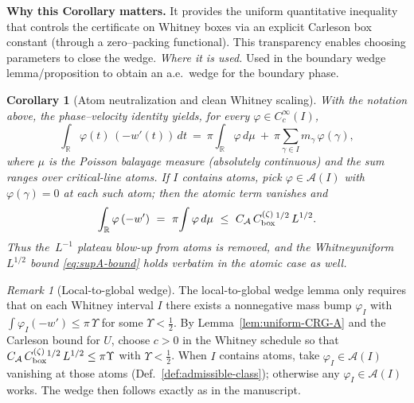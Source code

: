 \documentclass[11pt]{article}
\newtheorem{corollary}{Corollary}[section]
\theoremstyle{definition}
\theoremstyle{remark}
\newtheorem{remark}{Remark}[section]
\newcommand{\R}{\mathbb{R}}
\begin{document}
\vspace{1.0cm}
\noindent\textbf{Why this Corollary matters.} It provides the uniform quantitative inequality that controls the certificate on Whitney boxes via an explicit Carleson box constant (through a zero--packing functional). This transparency enables choosing parameters to close the wedge.
\noindent\textit{Where it is used.} Used in the boundary wedge lemma/proposition to obtain an a.e.\ wedge for the boundary phase.
\begin{corollary}[Atom neutralization and clean Whitney scaling]\label{cor:atom-safe}
With the notation above, the phase--velocity identity yields, for every \(\varphi\in C_c^\infty(I)\),
\[
  \int_{\R}\varphi(t)\,(-w'(t))\,dt
  \ =\ \pi\!\int_{\R}\varphi\,d\mu\ +\ \pi\sum_{\gamma\in I} m_\gamma\,\varphi(\gamma),
\]
where \(\mu\) is the Poisson balayage measure (absolutely continuous) and the sum ranges over critical-line atoms.
If \(I\) contains atoms, pick \(\varphi\in\mathcal A(I)\) with \(\varphi(\gamma)=0\) at each such atom; then the atomic term vanishes and
\[
  \int_{\R}\varphi\,(-w')\ =\ \pi\!\int \varphi\,d\mu\ \le\ C_{\mathcal A}\,C_{\rm box}^{(\zeta)}{}^{1/2}\,L^{1/2}.
\]
Thus the \(\,L^{-1}\) plateau blow-up from atoms is removed, and the Whitney\-uniform \(L^{1/2}\) bound \eqref{eq:supA-bound}
holds verbatim in the atomic case as well.
\end{corollary}


\begin{remark}[Local-to-global wedge]\label{rem:wedge-application}
The local-to-global wedge lemma only requires that on each Whitney interval \(I\) there exists a nonnegative mass bump
\(\varphi_I\) with \(\int \varphi_I(-w')\le \pi\,\Upsilon\) for some \(\Upsilon<\tfrac12\).
By Lemma~\ref{lem:uniform-CRG-A} and the Carleson bound for \(U\),
choose \(c>0\) in the Whitney schedule so that
\(C_{\mathcal A}\,C_{\rm box}^{(\zeta)}{}^{1/2}\,L^{1/2}\le \pi\Upsilon\) with \(\Upsilon<\tfrac12\).
When \(I\) contains atoms, take \(\varphi_I\in\mathcal A(I)\) vanishing at those atoms (Def.~\ref{def:admissible-class});
otherwise any \(\varphi_I\in\mathcal A(I)\) works.
The wedge then follows exactly as in the manuscript.
\end{remark}
\end{document}
